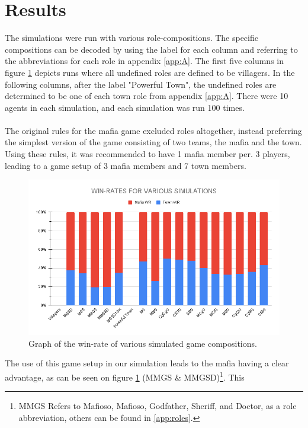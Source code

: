 \section{Results}\label{sec:results}
The simulations were run with various role-compositions. The specific
compositions can be decoded by using the label for each column and referring to
the abbreviations for each role in appendix \ref{app:A}. The first five columns
in figure \ref{fig:VariousSimulations} depicts runs where all undefined roles
are defined to be villagers. In the following columns, after the label
"Powerful Town", the undefined roles are determined to be one of each town role
from appendix \ref{app:A}. There were 10 agents in each simulation, and each
simulation was run 100 times.\\\\ The original rules for the mafia game
excluded roles altogether, instead preferring the simplest version of the game
consisting of two teams, the mafia and the town. Using these
rules\cite{MafiaRules}, it was recommended to have 1 mafia member per. 3
players, leading to a game setup of 3 mafia members and 7 town members.
\begin{figure}[H]
    \includegraphics[width=1\linewidth]{figures/Winrates}
    \caption{Graph of the win-rate of various
        simulated game compositions.}
    \label{fig:VariousSimulations}
\end{figure}
\vspace{-5px}
The use of this game setup in our simulation leads to the mafia having a clear
advantage, as can be seen on figure \ref{fig:VariousSimulations} (MMGS \&
MMGSD)\footnote{MMGS Refers to Mafioso, Mafioso, Godfather, Sheriff, and
    Doctor, as a role abbreviation, others can be found in \ref{app:roles}.}. This
